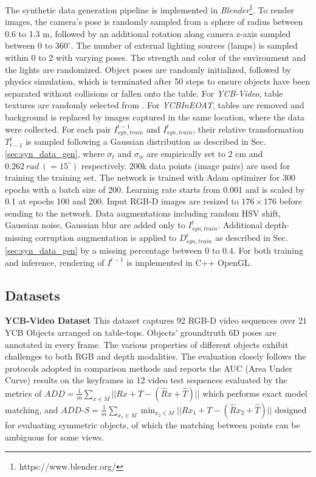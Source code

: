 \documentclass[letterpaper, 10 pt, conference]{ieeeconf}
\begin{document}
The synthetic data generation pipeline is implemented in \textit{Blender}\footnote{https://www.blender.org/}. To render images, the camera's pose is randomly sampled from a sphere of radius between 0.6 to 1.3 m, followed by an additional rotation along camera z-axis sampled between 0 to $360^{\circ}$. The number of external lighting sources (lamps) is sampled within 0 to 2 with varying poses. The strength and color of the environment and the lights are randomized. Object poses are randomly initialized, followed by physics simulation, which is terminated after 50 steps to ensure objects have been separated without collisions or fallen onto the table. For {\it YCB-Video}, table textures are randomly selected from \cite{galerne2010random}. For {\it YCBInEOAT}, tables are removed and background is replaced by images captured in the same location, where the data were collected. For each pair $I^{t-1}_{syn,train}$ and $I^{t}_{syn,train}$, their relative transformation $T_{t-1}^{t}$ is sampled following a Gaussian distribution as described in Sec. \ref{sec:syn_data_gen}, where $\sigma_t$ and $\sigma_w$ are empirically set to 2 cm and $0.262\ rad \ (=15^{\circ} )$ respectively. 200k data points (image pairs) are used for training the training set. The network is trained with Adam optimizer for 300 epochs with a batch size of 200. Learning rate starts from 0.001 and is scaled by 0.1 at epochs 100 and 200. Input RGB-D images are resized to $176 \times 176$ before sending to the network. Data augmentations including random HSV shift, Gaussian noise, Gaussian blur are added only to $I^{t}_{syn,train}$. Additional depth-missing corruption augmentation is applied to $D^{t}_{syn,train}$ as described in Sec. \ref{sec:syn_data_gen} by a missing percentage between 0 to 0.4. For both training and inference, rendering of $I^{t-1}$ is implemented in C++ OpenGL.


\subsection{Datasets}
\noindent \textbf{YCB-Video Dataset} This dataset \cite{xiang2017posecnn} captures 92 RGB-D video sequences over 21 YCB Objects \cite{calli2015ycb} arranged on table-tops. Objects' groundtruth 6D poses are annotated in every frame. The various properties of different objects exhibit challenges to both RGB and depth modalities. The evaluation closely follows the protocols adopted in comparison methods \cite{xiang2017posecnn, deng2019poserbpf, li2018deepim, wang2019densefusion} and reports the AUC (Area Under Curve) results on the keyframes in 12 video test sequences evaluated by the metrics of $ADD = \frac{1}{m}\sum_{x \in M} ||Rx+T-(\hat{R}x+\hat{T})||$ which performs exact model matching, and $ADD$-$S = \frac{1}{m}\sum_{x_1 \in M} \min_{x_2 \in M}||Rx_1+T-(\hat{R}x_2+\hat{T})||$ \cite{xiang2017posecnn} designed for evaluating symmetric objects, of which the matching between points can be ambiguous for some views.
\end{document}
